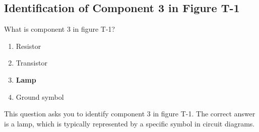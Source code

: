 \subsection{Identification of Component 3 in Figure T-1}
\label{T6C04}

\begin{tcolorbox}[colback=gray!10!white,colframe=black!75!black,title=T6C04]
What is component 3 in figure T-1?
\begin{enumerate}[noitemsep]
    \item Resistor
    \item Transistor
    \item \textbf{Lamp}
    \item Ground symbol
\end{enumerate}
\end{tcolorbox}

This question asks you to identify component 3 in figure T-1. The correct answer is a lamp, which is typically represented by a specific symbol in circuit diagrams.